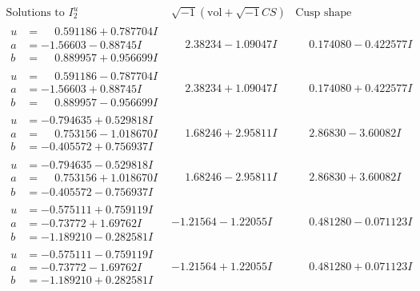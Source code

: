 \documentclass[1p]{elsarticle_modified}
\theoremstyle{definition}
\newcommand{\I}{\sqrt{-1}}
\begin{document}
$$\begin{array}{c|c|c}  
\text{Solutions to }I^u_{2}& \I (\text{vol} + \sqrt{-1}CS) & \text{Cusp shape}\\
 \hline 
\begin{aligned}
u &= \phantom{-}0.591186 + 0.787704 I \\
a &= -1.56603 - 0.88745 I \\
b &= \phantom{-}0.889957 + 0.956699 I\end{aligned}
 & \phantom{-}2.38234 - 1.09047 I & \phantom{-}0.174080 - 0.422577 I \\ \hline\begin{aligned}
u &= \phantom{-}0.591186 - 0.787704 I \\
a &= -1.56603 + 0.88745 I \\
b &= \phantom{-}0.889957 - 0.956699 I\end{aligned}
 & \phantom{-}2.38234 + 1.09047 I & \phantom{-}0.174080 + 0.422577 I \\ \hline\begin{aligned}
u &= -0.794635 + 0.529818 I \\
a &= \phantom{-}0.753156 - 1.018670 I \\
b &= -0.405572 + 0.756937 I\end{aligned}
 & \phantom{-}1.68246 + 2.95811 I & \phantom{-}2.86830 - 3.60082 I \\ \hline\begin{aligned}
u &= -0.794635 - 0.529818 I \\
a &= \phantom{-}0.753156 + 1.018670 I \\
b &= -0.405572 - 0.756937 I\end{aligned}
 & \phantom{-}1.68246 - 2.95811 I & \phantom{-}2.86830 + 3.60082 I \\ \hline\begin{aligned}
u &= -0.575111 + 0.759119 I \\
a &= -0.73772 + 1.69762 I \\
b &= -1.189210 - 0.282581 I\end{aligned}
 & -1.21564 - 1.22055 I & \phantom{-}0.481280 - 0.071123 I \\ \hline\begin{aligned}
u &= -0.575111 - 0.759119 I \\
a &= -0.73772 - 1.69762 I \\
b &= -1.189210 + 0.282581 I\end{aligned}
 & -1.21564 + 1.22055 I & \phantom{-}0.481280 + 0.071123 I \\ \hline\begin{aligned}

\end{aligned}
\end{array}$$
\end{document}
